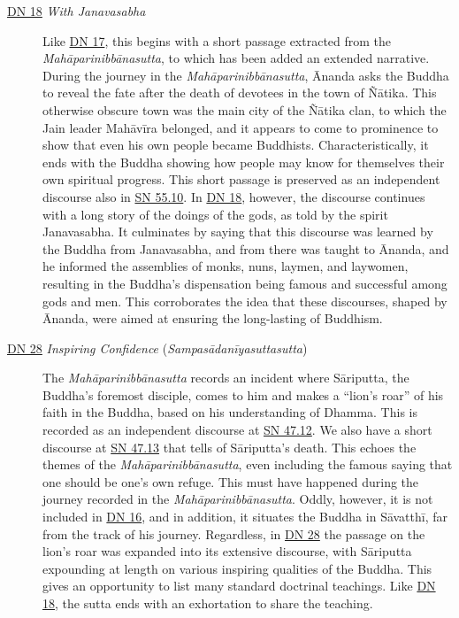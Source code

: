 \documentclass[12pt,openany]{book}%
\begin{document}
\begin{description}
\item[\href{https://suttacentral.net/dn18}{DN 18} \textit{With Janavasabha}] Like \href{https://suttacentral.net/dn17}{DN 17}, this begins with a short passage extracted from the \textit{\textsanskrit{Mahāparinibbānasutta}}, to which has been added an extended narrative. During the journey in the \textit{\textsanskrit{Mahāparinibbānasutta}}, Ānanda asks the Buddha to reveal the fate after the death of devotees in the town of \textsanskrit{Ñātika}. This otherwise obscure town was the main city of the \textsanskrit{Ñātika} clan, to which the Jain leader \textsanskrit{Mahāvīra} belonged, and it appears to come to prominence to show that even his own people became Buddhists. Characteristically, it ends with the Buddha showing how people may know for themselves their own spiritual progress. This short passage is preserved as an independent discourse also in \href{https://suttacentral.net/sn55.10}{SN 55.10}. In \href{https://suttacentral.net/dn18}{DN 18}, however, the discourse continues with a long story of the doings of the gods, as told by the spirit Janavasabha. It culminates by saying that this discourse was learned by the Buddha from Janavasabha, and from there was taught to Ānanda, and he informed the assemblies of monks, nuns, laymen, and laywomen, resulting in the Buddha’s dispensation being famous and successful among gods and men. This corroborates the idea that these discourses, shaped by Ānanda, were aimed at ensuring the long-lasting of Buddhism.%
\item[\href{https://suttacentral.net/dn28}{DN 28} \textit{Inspiring Confidence} (\textit{\textsanskrit{Sampasādanīyasuttasutta}})] The \textit{\textsanskrit{Mahāparinibbānasutta}} records an incident where \textsanskrit{Sāriputta}, the Buddha’s foremost disciple, comes to him and makes a “lion’s roar” of his faith in the Buddha, based on his understanding of Dhamma. This is recorded as an independent discourse at \href{https://suttacentral.net/sn47.12}{SN 47.12}. We also have a short discourse at \href{https://suttacentral.net/sn47.13}{SN 47.13} that tells of \textsanskrit{Sāriputta}’s death. This echoes the themes of the \textit{\textsanskrit{Mahāparinibbānasutta}}, even including the famous saying that one should be one’s own refuge. This must have happened during the journey recorded in the \textit{\textsanskrit{Mahāparinibbānasutta}}. Oddly, however, it is not included in \href{https://suttacentral.net/dn16}{DN 16}, and in addition, it situates the Buddha in \textsanskrit{Sāvatthī}, far from the track of his journey. Regardless, in \href{https://suttacentral.net/dn28}{DN 28} the passage on the lion’s roar was expanded into its extensive discourse, with \textsanskrit{Sāriputta} expounding at length on various inspiring qualities of the Buddha. This gives an opportunity to list many standard doctrinal teachings. Like \href{https://suttacentral.net/dn18}{DN 18}, the sutta ends with an exhortation to share the teaching.%
\end{description}
\end{document}
